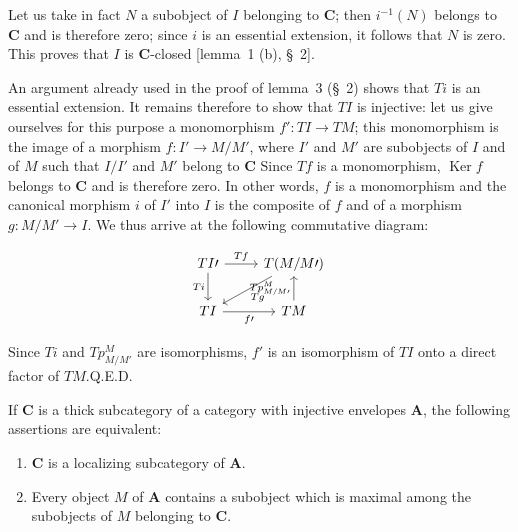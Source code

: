 Let us take in fact $N$ a subobject of $I$ belonging to $\mathbf{C}$; then
$i^{-1}(N)$ belongs to $\mathbf{C}$ and is therefore zero; since $i$ is an
essential extension, it follows that $N$ is zero. This proves that $I$ is
$\mathbf{C}$-closed [lemma~1 (b), \S~2].

An argument already used in the proof of lemma~3 (\S~2) shows that $Ti$ is
an essential extension. It remains therefore to show that $TI$ is
injective: let us give ourselves for this purpose a monomorphism
$f'\colon TI\to TM$; this monomorphism is the image of a morphism
$f\colon I'\to M/M'$, where $I'$ and $M'$ are subobjects of $I$ and of
$M$ such that $I/I'$ and $M'$ belong to $\mathbf{C}$
Since $Tf$ is a monomorphism, $\operatorname{Ker}f$ belongs to $\mathbf{C}$
and is therefore zero. In other words, $f$ is a monomorphism and the
canonical morphism $i$ of $I'$ into $I$ is the composite of $f$ and of a
morphism $g\colon M/M'\to I$. We thus arrive at the following commutative
diagram:

\[
\begin{tikzcd}
TI\prime \arrow[r, "Tf"] \arrow[d, "Ti"'] &
T(M/M\prime) \arrow[ld, "Tg"] \\
TI \arrow[r, "f\prime"'] & TM \arrow[u, "Tp^{M}_{M/M\prime}"]
\end{tikzcd}
\]

Since $Ti$ and $Tp^{M}_{M/M'}$ are isomorphisms, $f'$ is an isomorphism of
$TI$ onto a direct factor of $TM$.\hfill Q.E.D.

\begin{corollary}
If $\mathbf{C}$ is a thick subcategory of a category with injective
envelopes $\mathbf{A}$, the following assertions are equivalent:
\begin{enumerate}
\item[a.] $\mathbf{C}$ is a localizing subcategory of $\mathbf{A}$.
\item[b.] Every object $M$ of $\mathbf{A}$ contains a subobject which is
      maximal among the subobjects of $M$ belonging to $\mathbf{C}$.
\end{enumerate}
\end{corollary}

